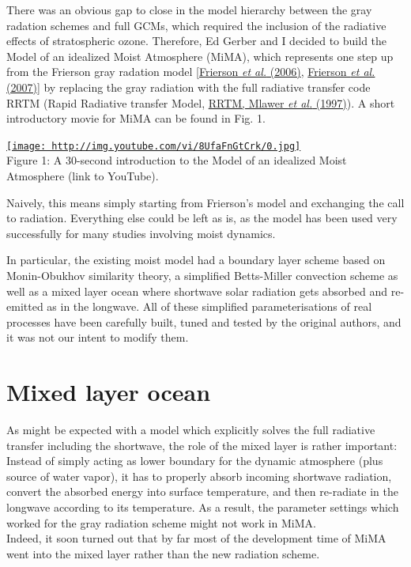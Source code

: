 There was an obvious gap to close in the model hierarchy between the
gray radation schemes and full GCMs, which required the inclusion of the
radiative effects of stratospheric ozone. Therefore, Ed Gerber and I
decided to build the Model of an idealized Moist Atmosphere (MiMA),
which represents one step up from the Frierson gray radation model
{[}\href{http://journals.ametsoc.org/doi/abs/10.1175/JAS3753.1}{Frierson
\emph{et al.} (2006)},
\href{http://journals.ametsoc.org/doi/abs/10.1175/JAS3935.1}{Frierson
\emph{et al.} (2007)}{]} by replacing the gray radiation with the full
radiative transfer code RRTM (Rapid Radiative transfer Model,
\href{http://doi.wiley.com/10.1029/97JD00237}{RRTM, Mlawer \emph{et al.}
(1997)}). A short introductory movie for MiMA can be found in Fig. 1.

\href{http://www.youtube.com/watch?v=8UfaFnGtCrk}{\texttt{[image: http://img.youtube.com/vi/8UfaFnGtCrk/0.jpg]}}\\
Figure 1: A 30-second introduction to the Model of an idealized Moist
Atmosphere (link to YouTube).

Naively, this means simply starting from Frierson's model and exchanging
the call to radiation. Everything else could be left as is, as the model
has been used very successfully for many studies involving moist
dynamics.

In particular, the existing moist model had a boundary layer scheme
based on Monin-Obukhov similarity theory, a simplified Betts-Miller
convection scheme as well as a mixed layer ocean where shortwave solar
radiation gets absorbed and re-emitted as in the longwave. All of these
simplified parameterisations of real processes have been carefully
built, tuned and tested by the original authors, and it was not our
intent to modify them.

\section{Mixed layer ocean}\label{mixed-layer-ocean}

As might be expected with a model which explicitly solves the full
radiative transfer including the shortwave, the role of the mixed layer
is rather important: Instead of simply acting as lower boundary for the
dynamic atmosphere (plus source of water vapor), it has to properly
absorb incoming shortwave radiation, convert the absorbed energy into
surface temperature, and then re-radiate in the longwave according to
its temperature. As a result, the parameter settings which worked for
the gray radiation scheme might not work in MiMA.\\
Indeed, it soon turned out that by far most of the development time of
MiMA went into the mixed layer rather than the new radiation scheme.

